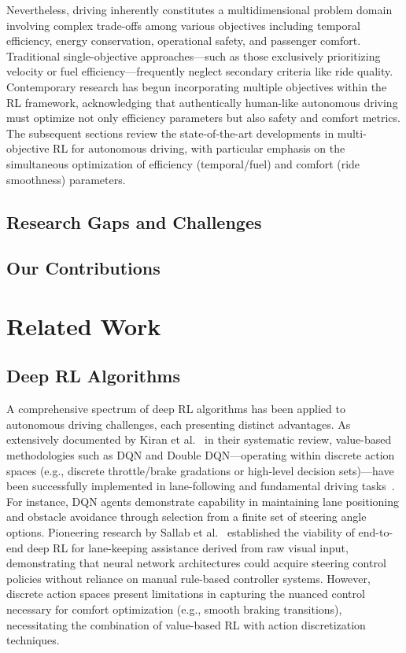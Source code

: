 \documentclass[12pt,a4paper]{article}
\begin{document}
Nevertheless, driving inherently constitutes a multidimensional problem domain involving complex trade-offs among various objectives including temporal efficiency, energy conservation, operational safety, and passenger comfort. Traditional single-objective approaches—such as those exclusively prioritizing velocity or fuel efficiency—frequently neglect secondary criteria like ride quality. Contemporary research has begun incorporating multiple objectives within the RL framework, acknowledging that authentically human-like autonomous driving must optimize not only efficiency parameters but also safety and comfort metrics. The subsequent sections review the state-of-the-art developments in multi-objective RL for autonomous driving, with particular emphasis on the simultaneous optimization of efficiency (temporal/fuel) and comfort (ride smoothness) parameters.

\subsection{Research Gaps and Challenges}


\subsection{Our Contributions}


\section{Related Work}

\subsection{Deep RL Algorithms}
A comprehensive spectrum of deep RL algorithms has been applied to autonomous driving challenges, each presenting distinct advantages. As extensively documented by Kiran et al.~\cite{kiran2022} in their systematic review, value-based methodologies such as DQN and Double DQN—operating within discrete action spaces (e.g., discrete throttle/brake gradations or high-level decision sets)—have been successfully implemented in lane-following and fundamental driving tasks~\cite{hossain2023}. For instance, DQN agents demonstrate capability in maintaining lane positioning and obstacle avoidance through selection from a finite set of steering angle options. Pioneering research by Sallab et al.~\cite{sallab2016} established the viability of end-to-end deep RL for lane-keeping assistance derived from raw visual input, demonstrating that neural network architectures could acquire steering control policies without reliance on manual rule-based controller systems. However, discrete action spaces present limitations in capturing the nuanced control necessary for comfort optimization (e.g., smooth braking transitions), necessitating the combination of value-based RL with action discretization techniques.
\end{document}
